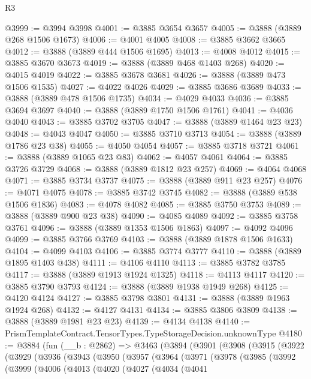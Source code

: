 \begin{lexlean}{R3}
\begin{coremodule}
@3999 := @3994 @3998
@4001 := @3885 @3654 @3657
@4005 := @3888 (@3889 @268 @1506 @1673)
@4006 := @4001 @4005
@4008 := @3885 @3662 @3665
@4012 := @3888 (@3889 @444 @1506 @1695)
@4013 := @4008 @4012
@4015 := @3885 @3670 @3673
@4019 := @3888 (@3889 @468 @1403 @268)
@4020 := @4015 @4019
@4022 := @3885 @3678 @3681
@4026 := @3888 (@3889 @473 @1506 @1535)
@4027 := @4022 @4026
@4029 := @3885 @3686 @3689
@4033 := @3888 (@3889 @478 @1506 @1735)
@4034 := @4029 @4033
@4036 := @3885 @3694 @3697
@4040 := @3888 (@3889 @1750 @1506 @1761)
@4041 := @4036 @4040
@4043 := @3885 @3702 @3705
@4047 := @3888 (@3889 @1464 @23 @23)
@4048 := @4043 @4047
@4050 := @3885 @3710 @3713
@4054 := @3888 (@3889 @1786 @23 @38)
@4055 := @4050 @4054
@4057 := @3885 @3718 @3721
@4061 := @3888 (@3889 @1065 @23 @83)
@4062 := @4057 @4061
@4064 := @3885 @3726 @3729
@4068 := @3888 (@3889 @1812 @23 @257)
@4069 := @4064 @4068
@4071 := @3885 @3734 @3737
@4075 := @3888 (@3889 @911 @23 @257)
@4076 := @4071 @4075
@4078 := @3885 @3742 @3745
@4082 := @3888 (@3889 @538 @1506 @1836)
@4083 := @4078 @4082
@4085 := @3885 @3750 @3753
@4089 := @3888 (@3889 @900 @23 @38)
@4090 := @4085 @4089
@4092 := @3885 @3758 @3761
@4096 := @3888 (@3889 @1353 @1506 @1863)
@4097 := @4092 @4096
@4099 := @3885 @3766 @3769
@4103 := @3888 (@3889 @1878 @1506 @1633)
@4104 := @4099 @4103
@4106 := @3885 @3774 @3777
@4110 := @3888 (@3889 @1895 @1403 @438)
@4111 := @4106 @4110
@4113 := @3885 @3782 @3785
@4117 := @3888 (@3889 @1913 @1924 @1325)
@4118 := @4113 @4117
@4120 := @3885 @3790 @3793
@4124 := @3888 (@3889 @1938 @1949 @268)
@4125 := @4120 @4124
@4127 := @3885 @3798 @3801
@4131 := @3888 (@3889 @1963 @1924 @268)
@4132 := @4127 @4131
@4134 := @3885 @3806 @3809
@4138 := @3888 (@3889 @1981 @23 @23)
@4139 := @4134 @4138
@4140 := PrismTemplateContract.TensorTypes.TypeStorageDecision.unknownType
@4180 := @3884
    (fun (__b : @2862) =>
    @3463
      (@3894
        (@3901
          (@3908
            (@3915
              (@3922
                (@3929
                  (@3936
                    (@3943
                      (@3950
                        (@3957
                          (@3964
                            (@3971
                              (@3978
                                (@3985
                                  (@3992
                                    (@3999
                                      (@4006
                                        (@4013
                                          (@4020
                                            (@4027
                                              (@4034
                                                (@4041

\end{coremodule}
\end{lexlean}
